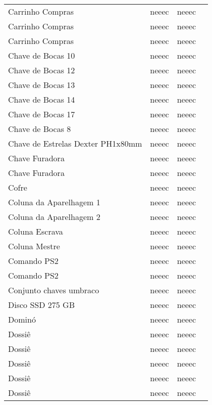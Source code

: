 \begin{longtable}{Xlll}
Carrinho Compras & \acrshort{neeec} & \acrshort{neeec} & \\
Carrinho Compras & \acrshort{neeec} & \acrshort{neeec} & \\
Carrinho Compras & \acrshort{neeec} & \acrshort{neeec} & \\
Chave de Bocas 10 & \acrshort{neeec} & \acrshort{neeec} & \\
Chave de Bocas 12 & \acrshort{neeec} & \acrshort{neeec} & \\
Chave de Bocas 13 & \acrshort{neeec} & \acrshort{neeec} & \\
Chave de Bocas 14 & \acrshort{neeec} & \acrshort{neeec} & \\
Chave de Bocas 17 & \acrshort{neeec} & \acrshort{neeec} & \\
Chave de Bocas 8 & \acrshort{neeec} & \acrshort{neeec} & \\
Chave de Estrelas Dexter PH1x80mm & \acrshort{neeec} & \acrshort{neeec} & \\
Chave Furadora & \acrshort{neeec} & \acrshort{neeec} & \\
Chave Furadora & \acrshort{neeec} & \acrshort{neeec} & \\
Cofre & \acrshort{neeec} & \acrshort{neeec} & \\
Coluna da Aparelhagem 1 & \acrshort{neeec} & \acrshort{neeec} & \\
Coluna da Aparelhagem 2 & \acrshort{neeec} & \acrshort{neeec} & \\
Coluna Escrava & \acrshort{neeec} & \acrshort{neeec} & \\
Coluna Mestre & \acrshort{neeec} & \acrshort{neeec} & \\
Comando PS2 & \acrshort{neeec} & \acrshort{neeec} & \\
Comando PS2 & \acrshort{neeec} & \acrshort{neeec} & \\
Conjunto chaves umbraco & \acrshort{neeec} & \acrshort{neeec} & \\
Disco SSD 275 GB & \acrshort{neeec} & \acrshort{neeec} & \\
Dominó & \acrshort{neeec} & \acrshort{neeec} & \\
Dossiê & \acrshort{neeec} & \acrshort{neeec} & \\
Dossiê & \acrshort{neeec} & \acrshort{neeec} & \\
Dossiê & \acrshort{neeec} & \acrshort{neeec} & \\
Dossiê & \acrshort{neeec} & \acrshort{neeec} & \\
Dossiê & \acrshort{neeec} & \acrshort{neeec} & \\

\end{longtable}
